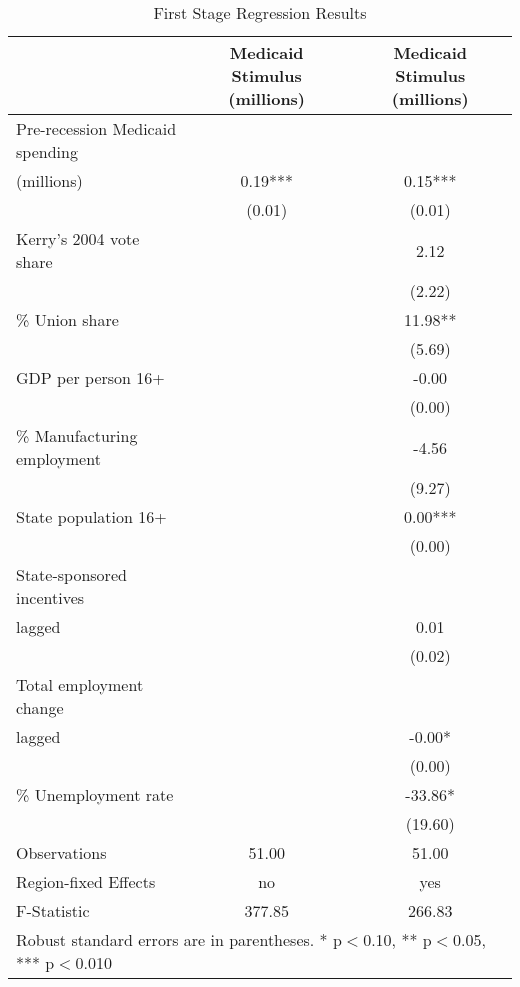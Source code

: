 \begin{table}[!htbp]\centering
\def\sym#1{\ifmmode^{#1}\else\(^{#1}\)\fi}
\caption{First Stage Regression Results}
\begin{tabular}{l*{2}{c}}
\hline\hline
                    &Medicaid Stimulus (millions)   &Medicaid Stimulus (millions)   \\
\hline
Pre-recession Medicaid spending \\ (millions)&        0.19***&        0.15***\\
                    &      (0.01)   &      (0.01)   \\
Kerry's 2004 vote share&               &        2.12   \\
                    &               &      (2.22)   \\
\% Union share      &               &       11.98** \\
                    &               &      (5.69)   \\
GDP per person 16+  &               &       -0.00   \\
                    &               &      (0.00)   \\
\% Manufacturing employment&               &       -4.56   \\
                    &               &      (9.27)   \\
 State population 16+&               &        0.00***\\
                    &               &      (0.00)   \\
State-sponsored incentives \\ lagged&               &        0.01   \\
                    &               &      (0.02)   \\
Total employment change \\ lagged&               &       -0.00*  \\
                    &               &      (0.00)   \\
\% Unemployment rate&               &      -33.86*  \\
                    &               &     (19.60)   \\
\hline
Observations        &       51.00   &       51.00   \\
Region-fixed Effects&          no   &         yes   \\
F-Statistic         &      377.85   &      266.83   \\
\hline\hline
\multicolumn{3}{p{\linewidth}}{\footnotesize Robust standard errors are in parentheses. * p$<$0.10, ** p$<$0.05, *** p$<$0.010}\\
\end{tabular}
\end{table}
